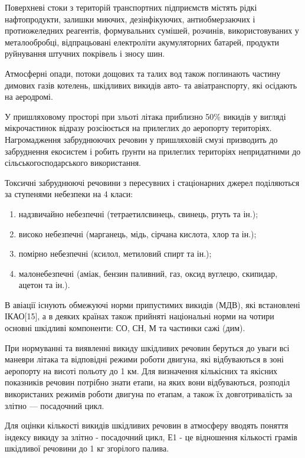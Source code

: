 Поверхневі стоки з територій транспортних підприємств містять рідкі нафтопродукти, залишки миючих, 
дезінфікуючих, антиобмерзаючих і протиожеледних реагентів, формувальних сумішей, розчинів, 
використовуваних у металообробці, відпрацьовані електроліти акумуляторних батарей, продукти 
руйнування штучних покрівель і зносу шин. 

Атмосферні опади, потоки дощових та талих вод також поглинають частину димових газів котелень, 
шкідливих викидів авто- та авіатранспорту, які осідають на аеродромі. 

У пришляховому просторі при зльоті літака приблизно 50\% викидів у вигляді мікрочастинок відразу 
розсіюється на прилеглих до аеропорту територіях. Нагромадження забруднюючих речовин у пришляховій 
смузі призводить до забруднення екосистем і робить ґрунти на прилеглих територіях непридатними до 
сільськогосподарського використання. 

Токсичні забруднюючі речовини з пересувних і стаціонарних джерел поділяються за ступенями небезпеки на 4 класи: 
\begin{enumerate}
 \item надзвичайно небезпечні (тетраетилсвинець, свинець, ртуть та ін.); 
 \item високо небезпечні (марганець, мідь, сірчана кислота, хлор та ін.); 
 \item помірно небезпечні (ксилол, метиловий спирт та ін.); 
 \item малонебезпечні (аміак, бензин паливний, газ, оксид вуглецю, скипидар, ацетон та ін.).
\end{enumerate}


В авіації існують обмежуючі норми припустимих викидів (МДВ), які встановлені ІКАО[15], а в деяких 
країнах також прийняті національні норми на чотири основні шкідливі компоненти: СО, СН, М та частинки сажі (дим).

При нормуванні та виявленні викиду шкідливих речовин беруться до уваги всі маневри літака та 
відповідні режими роботи двигуна, які відбуваються в зоні аеропорту на висоті польоту до 1 км. 
Для визначення кількісних та якісних показників речовин потрібно знати етапи, на яких вони 
відбуваються, розподіл використаних режимів роботи двигуна по етапам, а також їх довготривалість 
за злітно — посадочний цикл.

Для оцінки кількості викидів шкідливих речовин в атмосферу вводять поняття індексу викиду за злітно - 
посадочний цикл, Е1 - це відношення кількості грамів шкідливої речовини до 1 кг згорілого палива.

